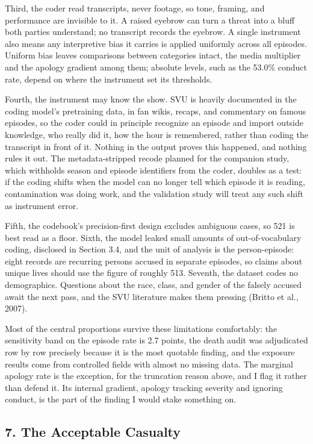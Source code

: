 \documentclass[
]{article}
\begin{document}
Third, the coder read transcripts, never footage, so tone, framing, and
performance are invisible to it. A raised eyebrow can turn a threat into
a bluff both parties understand; no transcript records the eyebrow. A
single instrument also means any interpretive bias it carries is applied
uniformly across all episodes. Uniform bias leaves comparisons between
categories intact, the media multiplier and the apology gradient among
them; absolute levels, such as the 53.0\% conduct rate, depend on where
the instrument set its thresholds.

Fourth, the instrument may know the show. SVU is heavily documented in
the coding model's pretraining data, in fan wikis, recaps, and
commentary on famous episodes, so the coder could in principle recognize
an episode and import outside knowledge, who really did it, how the hour
is remembered, rather than coding the transcript in front of it. Nothing
in the output proves this happened, and nothing rules it out. The
metadata-stripped recode planned for the companion study, which
withholds season and episode identifiers from the coder, doubles as a
test: if the coding shifts when the model can no longer tell which
episode it is reading, contamination was doing work, and the validation
study will treat any such shift as instrument error.

Fifth, the codebook's precision-first design excludes ambiguous cases,
so 521 is best read as a floor. Sixth, the model leaked small amounts of
out-of-vocabulary coding, disclosed in Section 3.4, and the unit of
analysis is the person-episode: eight records are recurring persons
accused in separate episodes, so claims about unique lives should use
the figure of roughly 513. Seventh, the dataset codes no demographics.
Questions about the race, class, and gender of the falsely accused await
the next pass, and the SVU literature makes them pressing (Britto et
al., 2007).

Most of the central proportions survive these limitations comfortably:
the sensitivity band on the episode rate is 2.7 points, the death audit
was adjudicated row by row precisely because it is the most quotable
finding, and the exposure results come from controlled fields with
almost no missing data. The marginal apology rate is the exception, for
the truncation reason above, and I flag it rather than defend it. Its
internal gradient, apology tracking severity and ignoring conduct, is
the part of the finding I would stake something on.

\subsection{7. The Acceptable Casualty}\label{the-acceptable-casualty}
\end{document}
